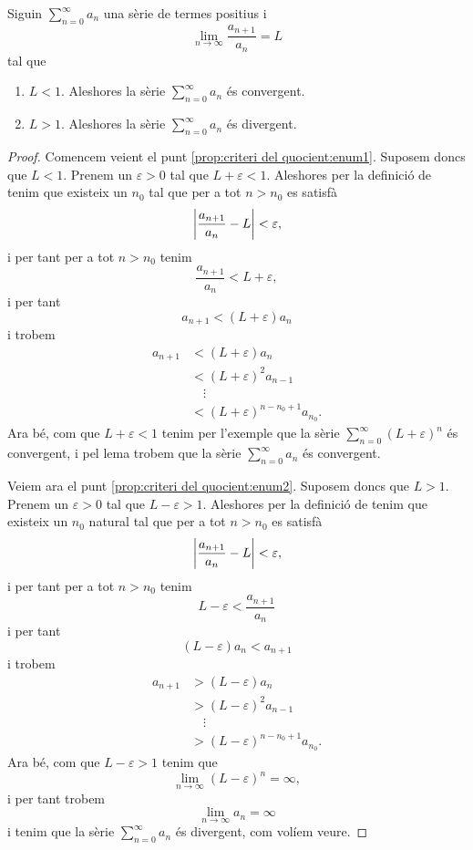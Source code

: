\documentclass[../../Main.tex]{subfiles}
\begin{document}
	\begin{proposition}
		\label{prop:criteri del quocient}
		Siguin \(\sum_{n=0}^{\infty}a_{n}\) una sèrie de termes positius i
		\[\lim_{n\to\infty}\frac{a_{n+1}}{a_{n}}=L\]
		tal que
		\begin{enumerate}
			\item\label{prop:criteri del quocient:enum1} \(L<1\). Aleshores la sèrie \(\sum_{n=0}^{\infty}a_{n}\) és convergent.
			\item\label{prop:criteri del quocient:enum2} \(L>1\). Aleshores la sèrie \(\sum_{n=0}^{\infty}a_{n}\) és divergent.
		\end{enumerate}
		\begin{proof}
			Comencem veient el punt \eqref{prop:criteri del quocient:enum1}. Suposem doncs que \(L<1\). Prenem un \(\varepsilon>0\) tal que \(L+\varepsilon<1\). Aleshores per la definició de  tenim que existeix un \(n_{0}\) tal que per a tot \(n>n_{0}\) es satisfà
			\[\abs{\frac{a_{n+1}}{a_{n}}-L}<\varepsilon,\]
			i per tant per a tot \(n>n_{0}\) tenim
			\[\frac{a_{n+1}}{a_{n}}<L+\varepsilon,\]
			i per tant
			\[a_{n+1}<(L+\varepsilon)a_{n}\]
			i trobem
			\begin{align*}
				a_{n+1}&<(L+\varepsilon)a_{n}\\
				&<(L+\varepsilon)^{2}a_{n-1}\\
				&\quad\vdots\\
				&<(L+\varepsilon)^{n-n_{0}+1}a_{n_{0}}.
			\end{align*}
			Ara bé, com que \(L+\varepsilon<1\) tenim per l'exemple  que la sèrie \(\sum_{n=0}^{\infty}(L+\varepsilon)^{n}\) és convergent, i pel lema  trobem que la sèrie \(\sum_{n=0}^{\infty}a_{n}\) és convergent.
			
			Veiem ara el punt \eqref{prop:criteri del quocient:enum2}. Suposem doncs que \(L>1\). Prenem un \(\varepsilon>0\) tal que \(L-\varepsilon>1\). Aleshores per la definició de  tenim que existeix un \(n_{0}\) natural tal que per a tot \(n>n_{0}\) es satisfà
			\[\abs{\frac{a_{n+1}}{a_{n}}-L}<\varepsilon,\]
			i per tant per a tot \(n>n_{0}\) tenim
			\[L-\varepsilon<\frac{a_{n+1}}{a_{n}}\]
			i per tant
			\[(L-\varepsilon)a_{n}<a_{n+1}\]
			i trobem
			\begin{align*}
				a_{n+1}&>(L-\varepsilon)a_{n}\\
				&>(L-\varepsilon)^{2}a_{n-1}\\
				&\quad\vdots\\
				&>(L-\varepsilon)^{n-n_{0}+1}a_{n_{0}}.
			\end{align*}
			Ara bé, com que \(L-\varepsilon>1\) tenim que
			\[\lim_{n\to\infty}(L-\varepsilon)^{n}=\infty,\]
			i per tant trobem
			\[\lim_{n\to\infty}a_{n}=\infty\]
			i tenim que la sèrie \(\sum_{n=0}^{\infty}a_{n}\) és divergent, com volíem veure.
		\end{proof}
	\end{proposition}
\end{document}
